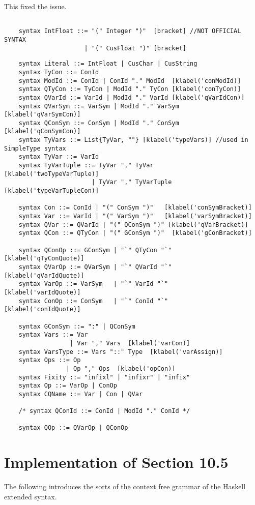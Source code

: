 This fixed the issue.
\begin{lstlisting}

    syntax IntFloat ::= "(" Integer ")"  [bracket] //NOT OFFICIAL SYNTAX
                      | "(" CusFloat ")" [bracket]
\end{lstlisting}
\begin{lstlisting}
    syntax Literal ::= IntFloat | CusChar | CusString
    syntax TyCon ::= ConId
    syntax ModId ::= ConId | ConId "." ModId  [klabel('conModId)]
    syntax QTyCon ::= TyCon | ModId "." TyCon [klabel('conTyCon)]
    syntax QVarId ::= VarId | ModId "." VarId [klabel('qVarIdCon)]
    syntax QVarSym ::= VarSym | ModId "." VarSym  [klabel('qVarSymCon)]
    syntax QConSym ::= ConSym | ModId "." ConSym  [klabel('qConSymCon)]
    syntax TyVars ::= List{TyVar, ""} [klabel('typeVars)] //used in SimpleType syntax
    syntax TyVar ::= VarId
    syntax TyVarTuple ::= TyVar "," TyVar      [klabel('twoTypeVarTuple)]
                        | TyVar "," TyVarTuple [klabel('typeVarTupleCon)]

    syntax Con ::= ConId | "(" ConSym ")"   [klabel('conSymBracket)]
    syntax Var ::= VarId | "(" VarSym ")"   [klabel('varSymBracket)]
    syntax QVar ::= QVarId | "(" QConSym ")" [klabel('qVarBracket)]
    syntax QCon ::= QTyCon | "(" GConSym ")"  [klabel('gConBracket)]

    syntax QConOp ::= GConSym | "`" QTyCon "`"    [klabel('qTyConQuote)]
    syntax QVarOp ::= QVarSym | "`" QVarId "`"    [klabel('qVarIdQuote)]
    syntax VarOp ::= VarSym   | "`" VarId "`"     [klabel('varIdQuote)]
    syntax ConOp ::= ConSym   | "`" ConId "`"     [klabel('conIdQuote)]

    syntax GConSym ::= ":" | QConSym
    syntax Vars ::= Var
                  | Var "," Vars  [klabel('varCon)]
    syntax VarsType ::= Vars "::" Type  [klabel('varAssign)]
    syntax Ops ::= Op
                 | Op "," Ops  [klabel('opCon)]
    syntax Fixity ::= "infixl" | "infixr" | "infix"
    syntax Op ::= VarOp | ConOp
    syntax CQName ::= Var | Con | QVar

    /* syntax QConId ::= ConId | ModId "." ConId */

    syntax QOp ::= QVarOp | QConOp
\end{lstlisting}

\section{Implementation of Section 10.5}
The following introduces the sorts of the context free grammar of the Haskell extended syntax.

